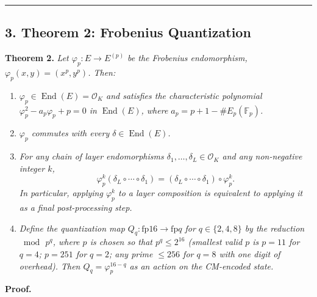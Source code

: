 \documentclass[
  11pt,
]{article}
\begin{document}
\begin{center}\rule{0.5\linewidth}{0.5pt}\end{center}

\hypertarget{theorem-2-frobenius-quantization}{%
\subsection{3. Theorem 2: Frobenius
Quantization}\label{theorem-2-frobenius-quantization}}

\textbf{Theorem 2.} \emph{Let \(\varphi_p : E \to E^{(p)}\) be the
Frobenius endomorphism, \(\varphi_p(x, y) = (x^p, y^p)\). Then:}

\begin{enumerate}
\def\labelenumi{(\alph{enumi})}
\item
  \emph{\(\varphi_p \in \operatorname{End}(E) = \mathcal{O}_K\) and
  satisfies the characteristic polynomial
  \(\varphi_p^2 - a_p \varphi_p + p = 0\) in \(\operatorname{End}(E)\),
  where \(a_p = p + 1 - \#E_p(\mathbb{F}_p)\).}
\item
  \emph{\(\varphi_p\) commutes with every
  \(\delta \in \operatorname{End}(E)\).}
\item
  \emph{For any chain of layer endomorphisms
  \(\delta_1, \dots, \delta_L \in \mathcal{O}_K\) and any non-negative
  integer \(k\),}
  \[\varphi_p^k(\delta_L \circ \cdots \circ \delta_1) = (\delta_L \circ \cdots \circ \delta_1) \circ \varphi_p^k.\]
  \emph{In particular, applying \(\varphi_p^k\) to a layer composition
  is equivalent to applying it as a final post-processing step.}
\item
  \emph{Define the quantization map
  \(Q_q : \mathrm{fp}16 \to \mathrm{fp}q\) for \(q \in \{2, 4, 8\}\) by
  the reduction \(\bmod\, p^q\), where \(p\) is chosen so that
  \(p^q \leq 2^{16}\) (smallest valid \(p\) is \(p = 11\) for \(q = 4\);
  \(p = 251\) for \(q = 2\); any prime \(\leq 256\) for \(q = 8\) with
  one digit of overhead). Then \(Q_q = \varphi_p^{16 - q}\) as an action
  on the CM-encoded state.}
\end{enumerate}

\textbf{Proof.}
\end{document}
